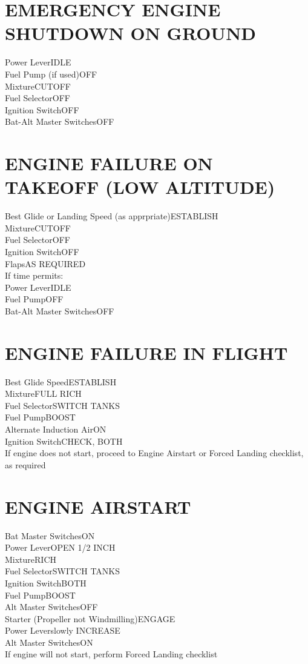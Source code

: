 \documentclass{article}
\begin{document}
\begin{multicols*}{2}
\section*{EMERGENCY ENGINE SHUTDOWN ON GROUND}
Power Lever\dotfill IDLE\\
Fuel Pump (if used)\dotfill OFF\\
Mixture\dotfill CUTOFF\\
Fuel Selector\dotfill OFF\\
Ignition Switch\dotfill OFF\\
Bat-Alt Master Switches\dotfill OFF
\section*{ENGINE FAILURE ON TAKEOFF (LOW ALTITUDE)}
Best Glide or Landing Speed (as apprpriate)\dotfill ESTABLISH\\
Mixture\dotfill CUTOFF\\
Fuel Selector\dotfill OFF\\
Ignition Switch\dotfill OFF\\
Flaps\dotfill AS REQUIRED\\
If time permits:\\
Power Lever\dotfill IDLE\\
Fuel Pump\dotfill OFF\\
Bat-Alt Master Switches\dotfill OFF
\section*{ENGINE FAILURE IN FLIGHT}
Best Glide Speed\dotfill ESTABLISH\\
Mixture\dotfill FULL RICH\\
Fuel Selector\dotfill SWITCH TANKS\\
Fuel Pump\dotfill BOOST\\
Alternate Induction Air\dotfill ON\\
Ignition Switch\dotfill CHECK, BOTH\\
If engine does not start, proceed to Engine Airstart or Forced Landing checklist, as required
\vfill\null
\section*{ENGINE AIRSTART}
Bat Master Switches\dotfill ON\\
Power Lever\dotfill OPEN 1/2 INCH\\
Mixture\dotfill RICH\\
Fuel Selector\dotfill SWITCH TANKS\\
Ignition Switch\dotfill BOTH\\
Fuel Pump\dotfill BOOST\\
Alt Master Switches\dotfill OFF\\
Starter (Propeller not Windmilling)\dotfill ENGAGE\\
Power Lever\dotfill slowly INCREASE\\
Alt Master Switches\dotfill ON\\
If engine will not start, perform Forced Landing checklist

\end{multicols*}
\end{document}

